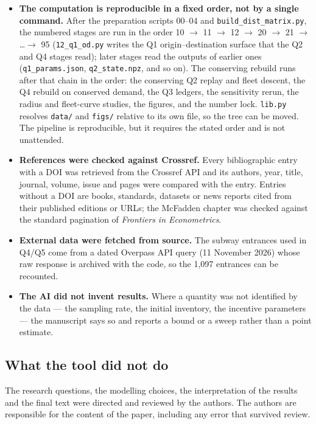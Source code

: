 \begin{itemize}[leftmargin=1.4em]
  vehicle-kilometre and one 07:00--20:00 shift. The 150-slot fence cap
  and the 450 m walking radius are typed; the 3{,}500-site knee is computed by the
  Kneedle rule on the capacity--coverage frontier, not typed. The incentive
  acceptance parameters $\kappa=2$, $\rho=0.35$ and $c_0=0.8$ are assumed (no reward
  was offered in the data), the reward grid is 0.05 CNY, the daily budget is
  30{,}000 CNY, and $c_0$ is re-optimised at 0.8 and 1.2 times its value; a full
  sweep of $\kappa$ and $\rho$ was not run. The truck-caliber unit cost 3.359162 is
  computed from the stored $K=60$ result, not typed.
\item \textbf{The computation is reproducible in a fixed order, not by a single
  command.} After the preparation scripts 00--04 and \texttt{build\_dist\_matrix.py},
  the numbered stages are run in the order 10 $\to$ 11 $\to$ 12 $\to$ 20 $\to$ 21
  $\to$ \dots $\to$ 95 (\texttt{12\_q1\_od.py} writes the Q1 origin--destination
  surface that the Q2 and Q4 stages read); later stages read the outputs of earlier
  ones (\texttt{q1\_params.json}, \texttt{q2\_state.npz}, and so on). The conserving
  rebuild runs after that chain in the order: the conserving Q2 replay and fleet
  descent, the Q4 rebuild on conserved demand, the Q3 ledgers, the sensitivity
  rerun, the radius and fleet-curve studies, the figures, and the number lock.
  \texttt{lib.py} resolves \texttt{data/} and \texttt{figs/} relative to its own
  file, so the tree can be moved. The pipeline is reproducible, but it requires the
  stated order and is not unattended.
\item \textbf{References were checked against Crossref.} Every bibliographic entry
  with a DOI was retrieved from the Crossref API and its authors, year, title,
  journal, volume, issue and pages were compared with the entry. Entries without a
  DOI are books, standards, datasets or news reports cited from their published
  editions or URLs; the McFadden chapter was checked against the standard pagination
  of \emph{Frontiers in Econometrics}.
\item \textbf{External data were fetched from source.} The subway entrances used in
  Q4/Q5 come from a dated Overpass API query (11 November 2026) whose raw response is
  archived with the code, so the 1,097 entrances can be recounted.
\item \textbf{The AI did not invent results.} Where a quantity was not identified by
  the data --- the sampling rate, the initial inventory, the incentive parameters ---
  the manuscript says so and reports a bound or a sweep rather than a point estimate.
\end{itemize}

\subsection*{What the tool did not do}

The research questions, the modelling choices, the interpretation of the results and
the final text were directed and reviewed by the authors. The authors are responsible
for the content of the paper, including any error that survived review.
